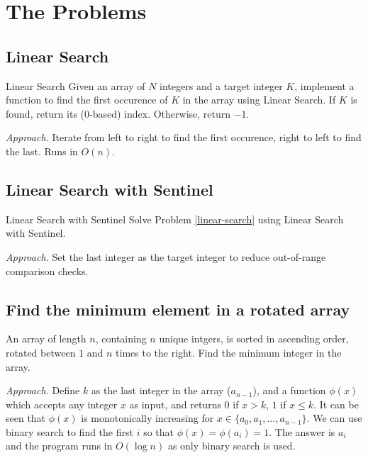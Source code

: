 \documentclass{article}
\begin{document}
    \section{The Problems}

    \subsection{Linear Search}

    \begin{statement}{Linear Search}{}
        Given an array of $N$ integers and a target integer $K$, implement a function to find the first occurence of $K$ in the array using Linear Search. If $K$ is found, return its (0-based) index. Otherwise, return $-1$.
    \end{statement}
    \label{linear-search}

    \emph{Approach.} Iterate from left to right to find the first occurence, right to left to find the last. Runs in $O(n)$.


    \subsection{Linear Search with Sentinel}

    \begin{statement}{Linear Search with Sentinel}{}
        Solve Problem \ref{linear-search} using Linear Search with Sentinel.
    \end{statement}

    \emph{Approach.} Set the last integer as the target integer to reduce out-of-range comparison checks.


    \subsection{Find the minimum element in a rotated array}

    \begin{statement}{}{}
        An array of length $n$, containing $n$ unique intgers, is sorted in ascending order, rotated between $1$ and $n$ times to the right. Find the minimum integer in the array.
    \end{statement}

    \emph{Approach.} Define $k$ as the last integer in the array ($a_{n - 1}$), and a function $\phi(x)$ which accepts any integer $x$ as input, and returns $0$ if $x > k$, $1$ if $x \le k$. It can be seen that $\phi(x)$ is monotonically increasing for $x \in \{a_0, a_1, \dots, a_{n - 1}\}$. We can use binary search to find the first $i$ so that $\phi(x) = \phi(a_i) = 1$. The answer is $a_i$ and the program runs in $O(\log n)$ as only binary search is used.
\end{document}
